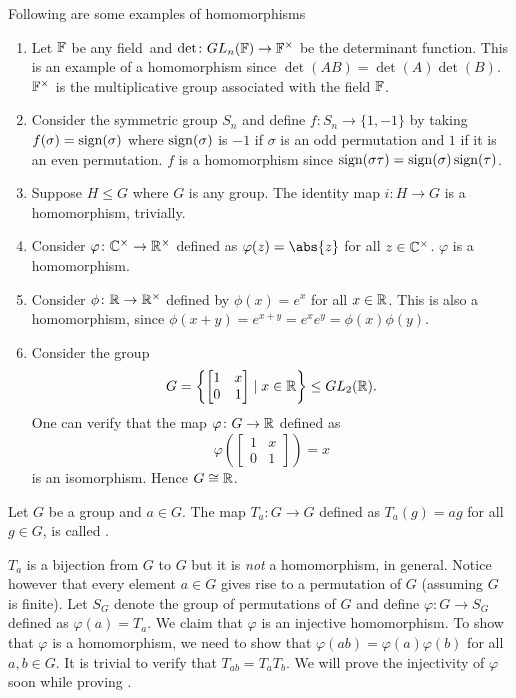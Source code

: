 \begin{ex}
Following are some examples of homomorphisms
\begin{enumerate}
    \item Let $\mathbb{F}$ be any field\footnotemark\ and $\det \colon GL_n(\mathbb{F}) \to \mathbb{F}^{\times}$ be the determinant function. This is an example of a homomorphism since $\det(AB) = \det(A)\det(B)$. $\mathbb{F}^{\times}$ is the multiplicative group associated with the field $\mathbb{F}$.
    \item Consider the symmetric group $S_n$ and define $f \colon S_n \to \{1, -1\}$ by taking $f(\sigma) = \operatorname{sign}(\sigma)$ where $\operatorname{sign}(\sigma)$ is $-1$ if $\sigma$ is an odd permutation and $1$ if it is an even permutation. $f$ is a homomorphism since $\operatorname{sign}(\sigma \tau) = \operatorname{sign}(\sigma) \operatorname{sign}(\tau)$.
    \item Suppose $H \leq G$ where $G$ is any group. The identity map $i \colon H \to G$ is a homomorphism, trivially.
    \item Consider $\varphi\colon \mathbb{C}^{\times} \to \mathbb{R}^{\times}$ defined as $\varphi(z) = \abs{z}$ for all $z \in \mathbb{C}^{\times}$. $\varphi$ is a homomorphism.
    \item Consider $\phi \colon \mathbb{R} \to \mathbb{R}^{\times}$ defined by $\phi(x) = e^x$ for all $x \in \mathbb{R}$. This is also a homomorphism, since $\phi(x+y) = e^{x+y} = e^xe^y = \phi(x)\phi(y)$.
    \item Consider the group
    \[
        G = \left\{ \begin{bmatrix}
            1 & x \\
            0 & 1
        \end{bmatrix} \mid x \in \mathbb{R} \right\} \leq GL_2(\mathbb{R}).
    \]
    One can verify that the map $\varphi \colon G \to \mathbb{R}$ defined as
    \[
        \varphi\left( \begin{bmatrix}
            1 & x \\
            0 & 1
        \end{bmatrix}\right) = x
    \]
    is an isomorphism. Hence $G \cong \mathbb{R}$.
\end{enumerate}
\end{ex}

\begin{defn}
    Let $G$ be a group and $a \in G$. The map $T_a \colon G \to G$ defined as $T_a(g) = ag$ for all $g \in G$, is called .
\end{defn}
$T_a$ is a bijection from $G$ to $G$ but it is \emph{not} a homomorphism, in general. Notice however that every element $a \in G$ gives rise to a permutation of $G$ (assuming $G$ is finite). Let $S_G$ denote the group of permutations of $G$ and define $\varphi \colon G \to S_G$ defined as $\varphi(a) = T_a$. We claim that $\varphi$ is an injective homomorphism. To show that $\varphi$ is a homomorphism, we need to show that $\varphi(ab) = \varphi(a)\varphi(b)$ for all $a,b \in G$. It is trivial to verify that $T_{ab} = T_aT_b$. We will prove the injectivity of $\varphi$ soon while proving .

